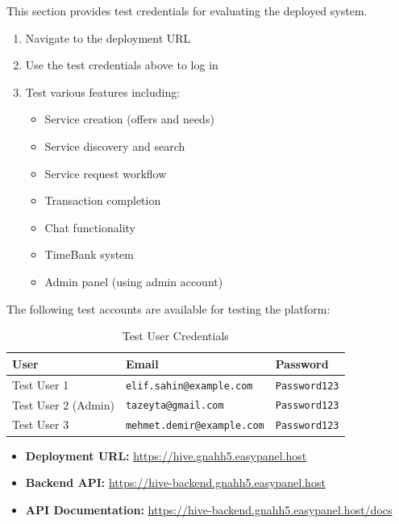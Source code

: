 \documentclass[12pt,a4paper]{report}
\begin{document}
This section provides test credentials for evaluating the deployed system.

\begin{enumerate}
    \item Navigate to the deployment URL
    \item Use the test credentials above to log in
    \item Test various features including:
          \begin{itemize}
              \item Service creation (offers and needs)
              \item Service discovery and search
              \item Service request workflow
              \item Transaction completion
              \item Chat functionality
              \item TimeBank system
              \item Admin panel (using admin account)
          \end{itemize}
\end{enumerate}

The following test accounts are available for testing the platform:

\begin{table}[h]
    \centering
    \begin{tabular}{|l|l|l|}
        \hline
        \textbf{User}       & \textbf{Email}                    & \textbf{Password}    \\
        \hline
        Test User 1         & \texttt{elif.sahin@example.com}   & \texttt{Password123} \\
        \hline
        Test User 2 (Admin) & \texttt{tazeyta@gmail.com}        & \texttt{Password123} \\
        \hline
        Test User 3         & \texttt{mehmet.demir@example.com} & \texttt{Password123} \\
        \hline
    \end{tabular}
    \caption{Test User Credentials}
\end{table}

\begin{itemize}
    \item \textbf{Deployment URL:} \url{https://hive.gnahh5.easypanel.host}
    \item \textbf{Backend API:} \url{https://hive-backend.gnahh5.easypanel.host}
    \item \textbf{API Documentation:} \url{https://hive-backend.gnahh5.easypanel.host/docs}
\end{itemize}
\end{document}
